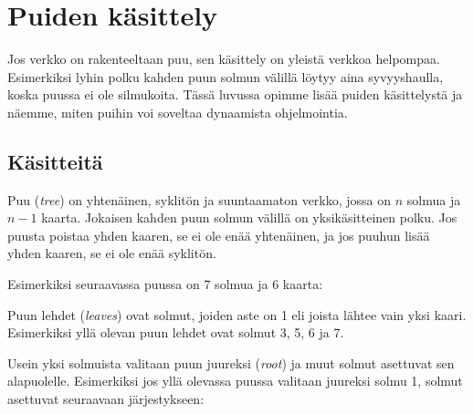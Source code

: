 \chapter{Puiden käsittely}

Jos verkko on rakenteeltaan puu, sen käsittely on yleistä
verkkoa helpompaa.
Esimerkiksi lyhin polku kahden puun solmun välillä
löytyy aina syvyyshaulla, koska puussa ei ole silmukoita.
Tässä luvussa opimme lisää puiden käsittelystä ja
näemme, miten puihin voi soveltaa dynaamista ohjelmointia.

\section{Käsitteitä}

Puu (\textit{tree}) on yhtenäinen, syklitön ja suuntaamaton verkko,
jossa on $n$ solmua ja $n-1$ kaarta.
Jokaisen kahden puun solmun välillä on yksikäsitteinen polku.
Jos puusta poistaa yhden kaaren, se ei ole enää yhtenäinen,
ja jos puuhun lisää yhden kaaren, se ei ole enää syklitön.

Esimerkiksi seuraavassa puussa on 7 solmua ja 6 kaarta:

\begin{center}
\end{center}

Puun lehdet (\textit{leaves}) ovat solmut,
joiden aste on 1 eli joista lähtee vain yksi kaari.
Esimerkiksi yllä olevan puun lehdet ovat
solmut 3, 5, 6 ja 7.

Usein yksi solmuista valitaan puun juureksi 
(\textit{root}) ja muut solmut asettuvat sen alapuolelle.
Esimerkiksi jos yllä olevassa puussa valitaan
juureksi solmu 1, solmut asettuvat seuraavaan järjestykseen:

\begin{center}
\end{center}

